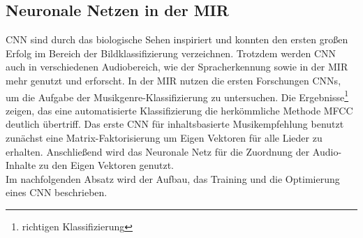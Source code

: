 \documentclass[twosided,a4,10pt]{article}
\begin{document}
\begin{multicols}{2}
		\section{Neuronale Netzen in der MIR}
		CNN sind durch das biologische Sehen inspiriert und konnten den ersten großen Erfolg im Bereich der Bildklassifizierung \cite{alex} verzeichnen. Trotzdem werden CNN auch in verschiedenen Audiobereich, wie der Spracherkennung \cite{graves} sowie in der MIR mehr genutzt und erforscht.\newline
		In der MIR nutzen die ersten Forschungen CNNs, um die Aufgabe der Musikgenre-Klassifizierung \cite{lee} zu untersuchen. Die Ergebnisse\footnote[5]{richtigen Klassifizierung} zeigen, das eine automatisierte Klassifizierung die herkömmliche Methode MFCC deutlich übertriff. Das erste CNN für inhaltsbasierte Musikempfehlung \cite{oord} benutzt zunächst eine Matrix-Faktorisierung um Eigen Vektoren für alle Lieder zu erhalten. Anschließend wird  das Neuronale Netz für die Zuordnung der Audio-Inhalte zu den Eigen Vektoren genutzt. \cite{wang}\newline\\
		Im nachfolgenden Absatz wird der Aufbau, das Training und die Optimierung eines CNN beschrieben.
		
		

\end{multicols}
\end{document}
